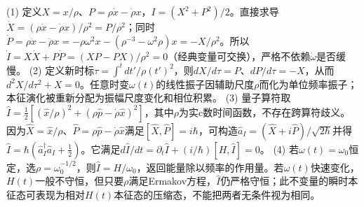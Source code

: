 (1) 定义\(X=x/\rho\)、\(P=\rho\dot x-\dot\rho x\)，\(I=(X^2+P^2)/2\)。直接求导\(\dot X=(\rho\dot x-\dot\rho x)/\rho^2=P/\rho^2\)；同时\(\dot P=\rho\ddot x-\ddot\rho x=-\rho\omega^2x-(\rho^{-3}-\omega^2\rho)x=-X/\rho^2\)。所以\(\dot I=X\dot X+P\dot P=(XP-PX)/\rho^2=0\)（经典变量可交换），严格不依赖\(\dot\omega\)是否缓慢。
(2) 定义新时标\(\tau=\int^tdt'/\rho(t')^2\)，则\(dX/d\tau=P\)、\(dP/d\tau=-X\)，从而\(d^2X/d\tau^2+X=0\)。任意时变\(\omega(t)\)的线性振子因辅助尺度\(\rho\)而化为单位频率振子；本征演化被重新分配为振幅尺度变化和相位积累。
(3) 量子算符取\(\hat I=\tfrac12[(\hat x/\rho)^2+(\rho\hat p-\dot\rho\hat x)^2]\)，其中\(\rho\)为实c数时间函数，不存在跨算符歧义。因为\(\hat X=\hat x/\rho\)、\(\hat P=\rho\hat p-\dot\rho\hat x\)满足\([\hat X,\hat P]=i\hbar\)，可构造\(\hat a_I=(\hat X+i\hat P)/\sqrt{2\hbar}\)并得\(\hat I=\hbar(\hat a_I^\dagger\hat a_I+\tfrac12)\)。它满足\(d\hat I/dt=\partial_t\hat I+(i/\hbar)[H,\hat I]=0\)。
(4) 若\(\omega(t)=\omega_0\)恒定，选\(\rho=\omega_0^{-1/2}\)，则\(\hat I=H/\omega_0\)，返回能量除以频率的作用量。若\(\omega(t)\)快速变化，\(H(t)\)一般不守恒，但只要\(\rho\)满足Ermakov方程，\(\hat I\)仍严格守恒；此不变量的瞬时本征态可表现为相对\(H(t)\)本征态的压缩态，不能把两者无条件视为相同。
